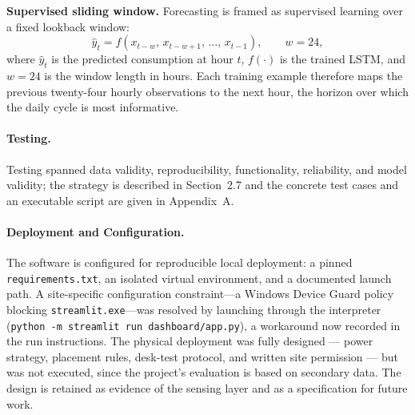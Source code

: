 \documentclass[11pt,a4paper]{article}
\begin{document}
\noindent\textbf{Supervised sliding window.} Forecasting is framed
as supervised learning over a fixed lookback window:
\begin{equation}
\hat{y}_{t} = f\!\left(x_{t-w},\,x_{t-w+1},\,\dots,\,x_{t-1}\right), \qquad w = 24,
\end{equation}
where $\hat{y}_t$ is the predicted consumption at hour $t$, $f(\cdot)$ is the
trained LSTM, and $w=24$ is the window length in hours. Each training example
therefore maps the previous twenty-four hourly observations to the next hour,
the horizon over which the daily cycle is most informative.


\paragraph{Testing.}
Testing spanned data validity, reproducibility, functionality, reliability, and
model validity; the strategy is described in Section~2.7 and the concrete test
cases and an executable script are given in Appendix~A.

\paragraph{Deployment and Configuration.}
The software is configured for reproducible local deployment: a pinned
\texttt{requirements.txt}, an isolated virtual environment, and a documented
launch path. A site-specific configuration constraint---a Windows Device Guard
policy blocking \texttt{streamlit.exe}---was resolved by launching through the
interpreter (\texttt{python -m streamlit run dashboard/app.py}), a workaround
now recorded in the run instructions. The physical deployment was fully designed --- power strategy, placement rules, desk-test protocol, and written site permission --- but was not executed, since the project's evaluation is based on secondary data. The design is retained as evidence of the sensing layer and as a specification for future work.
\end{document}
